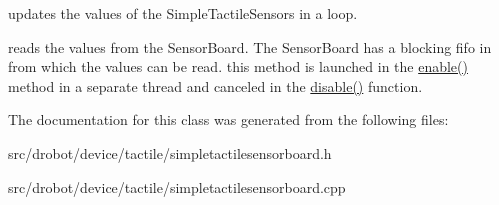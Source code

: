 updates the values of the Simple\-Tactile\-Sensors in a loop. 

reads the values from the Sensor\-Board. The Sensor\-Board has a blocking fifo in from which the values can be read. this method is launched in the \hyperlink{classdrobot_1_1device_1_1tactile_1_1SimpleTactileSensorBoard_a1660e1e8cd1d5705936a28ce9294d759}{enable()} method in a separate thread and canceled in the \hyperlink{classdrobot_1_1device_1_1DeviceBoard_a65eb028173bd7308192f1781d18f292d}{disable()} function. 

The documentation for this class was generated from the following files\-:\begin{DoxyCompactItemize}
\item 
src/drobot/device/tactile/simpletactilesensorboard.\-h\item 
src/drobot/device/tactile/simpletactilesensorboard.\-cpp\end{DoxyCompactItemize}
